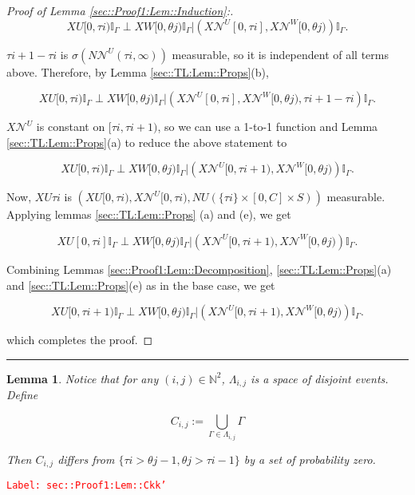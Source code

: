 \documentclass[12pt]{article}
\newcommand{\mb}{\mathbb}
\newcommand{\mc}{\mathcal}
\newcommand{\tr}{\textcolor{red}}
\newcommand{\labe}[1]{\tr{\texttt{Label: #1}}}
\newcommand{\lin}{\rule{\linewidth}{0.4 pt}}
\renewcommand{\U}{U}							%
\newcommand{\UU}{W}								%
\renewcommand{\S}{S}							%
\newcommand{\X}{X}								%
\newcommand{\neigh}{\mc{N}}						%
\newcommand{\vind}[1]{^{#1}}					%
\newcommand{\const}{C}							%
\newcommand{\poiss}{N}							%
\newcommand{\rt}{\tau}							%
\newcommand{\rtt}{\theta}						%
\newcommand{\apath}{\Gamma}						%
\newcommand{\pathset}[2]{\Lambda_{#1,#2}}		%
\newcommand{\pathsete}[2]{C_{#1,#2}}			%
\newtheorem{lem}[thms]{Lemma}
\begin{document}
\begin{proof}[Proof of Lemma \ref{sec::Proof1:Lem::Induction}:]
\[\X{\U}{[0,\rt{i})}\mb{I}_{\apath{}}\perp \X{\UU}{[0,\rtt{j})}\mb{I}_{\apath{}}|\left(\X{\neigh\vind{\U}}{[0,\rt{i}]},\X{\neigh\vind{\UU}}{[0,\rtt{j})}\right)\mb{I}_{\apath{}}.\]

\(\rt{i+1} - \rt{i}\) is \(\sigma(\poiss{\neigh\vind{\U}}(\rt{i},\infty))\) measurable, so it is independent of all terms above. Therefore, by Lemma \ref{sec::TL:Lem::Props}(b),

\[\X{\U}{[0,\rt{i})}\mb{I}_{\apath{}}\perp \X{\UU}{[0,\rtt{j})}\mb{I}_{\apath{}}|\left(\X{\neigh\vind{\U}}{[0,\rt{i}]},\X{\neigh\vind{\UU}}{[0,\rtt{j})},\rt{i+1} - \rt{i}\right)\mb{I}_{\apath{}}.\]

\(\X{\neigh\vind{\U}}{}\) is constant on \([\rt{i},\rt{i+1})\), so we can use a 1-to-1 function and Lemma \ref{sec::TL:Lem::Props}(a) to reduce the above statement to

\[\X{\U}{[0,\rt{i})}\mb{I}_{\apath{}}\perp \X{\UU}{[0,\rtt{j})}\mb{I}_{\apath{}}|\left(\X{\neigh\vind{\U}}{[0,\rt{i+1})},\X{\neigh\vind{\UU}}{[0,\rtt{j})}\right)\mb{I}_{\apath{}}.\]

Now, \(\X{\U}{\rt{i}}\) is \(\left(\X{\U}{[0,\rt{i})}, \X{\neigh\vind{\U}}{[0,\rt{i})}, \poiss{\U}(\{\rt{i}\}\times [0,\const{}]\times\S)\right)\) measurable. Applying lemmas \ref{sec::TL:Lem::Props} (a) and (e), we get

\[\X{\U}{[0,\rt{i}]}\mb{I}_{\apath{}}\perp \X{\UU}{[0,\rtt{j})}\mb{I}_{\apath{}}|\left(\X{\neigh\vind{\U}}{[0,\rt{i+1})},\X{\neigh\vind{\UU}}{[0,\rtt{j})}\right)\mb{I}_{\apath{}}.\]

Combining Lemmas \ref{sec::Proof1:Lem::Decomposition}, \ref{sec::TL:Lem::Props}(a) and \ref{sec::TL:Lem::Props}(e) as in the base case, we get

\[\X{\U}{[0,\rt{i+1})}\mb{I}_{\apath{}}\perp \X{\UU}{[0,\rtt{j})}\mb{I}_{\apath{}}|\left(\X{\neigh\vind{\U}}{[0,\rt{i+1})},\X{\neigh\vind{\UU}}{[0,\rtt{j})}\right)\mb{I}_{\apath{}}.\]

which completes the proof.
\end{proof}

\lin

\begin{lem}
Notice that for any \((i,j) \in \mb{N}^2\), \(\pathset{i}{j}\) is a space of disjoint events. Define

\[\pathsete{i}{j} := \bigcup_{\apath{}\in\pathset{i}{j}} \apath{}\]

Then \(\pathsete{i}{j}\) differs from \(\{\rt{i} > \rtt{j-1}, \rtt{j} > \rt{i-1}\}\) by a set of probability zero.
\label{sec::Proof1:Lem::Ckk'}
\end{lem}
\labe{sec::Proof1:Lem::Ckk'}
\end{document}
